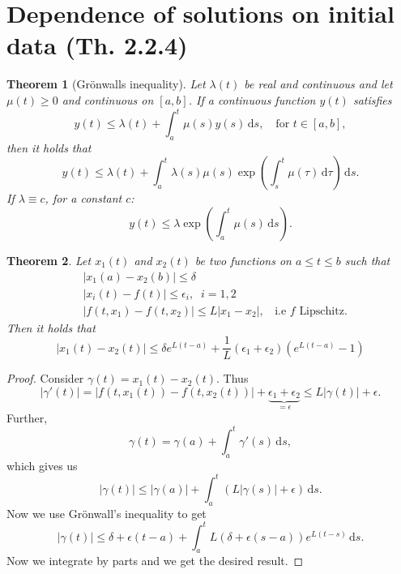 \documentclass[12pt, a4paper]{article}
\newcommand{\rd}{\ensuremath{\mathrm{d}}}
\newcommand{\id}{\ensuremath{\,\rd}}
\newtheorem{theorem}{Theorem}[section]
\begin{document}
\section{Dependence of solutions on initial data (Th. 2.2.4)}

\begin{theorem}[Grönwalls inequality]
Let $\lambda(t)$ be real and continuous and let $\mu(t)\geq 0$ and continuous on $[a,b]$. If a continuous function $y(t)$ satisfies
\begin{equation*}
y(t) \leq \lambda(t) + \int_a^t \mu(s)y(s)\id s, \quad \text{for } t\in[a,b],
\end{equation*}
then it holds that
\begin{equation*}
y(t)\leq \lambda(t) + \int_a^t \lambda(s)\mu(s)\exp\left(\int_s^t \mu(\tau)\id \tau\right)\id s.
\end{equation*}
If $\lambda \equiv c$, for a constant $c$:
\begin{equation*}
y(t) \leq \lambda \exp\left(\int_a^t \mu(s)\id s\right).
\end{equation*}
\end{theorem}

\begin{theorem}
Let $x_1(t)$ and $x_2(t)$ be two functions on $a\leq t\leq b$ such that
\begin{equation*}
\begin{split}
&|x_1(a)-x_2(b)|\leq\delta\\
&|x_i(t)-f(t)|\leq\epsilon_i,\;\; i=1,2 \\
&|f(t,x_1) - f(t,x_2)| \leq L|x_1-x_2|,\;\; \text{ i.e } f \text{ Lipschitz}.
\end{split}
\end{equation*}
Then it holds that
\begin{equation*}
|x_1(t)-x_2(t)|\leq \delta e^{L(t-a)}+ \frac{1}{L}(\epsilon_1 + \epsilon_2)(e^{L(t-a)}-1)
\end{equation*}
\end{theorem}
\begin{proof}
Consider $\gamma(t) = x_1(t) - x_2(t)$. Thus
\begin{equation*}
|\gamma '(t)| = |f(t,x_1(t))-f(t,x_2(t))| + \underbrace{\epsilon_1 + \epsilon_2}_{=\epsilon} \leq L|\gamma(t)|+\epsilon.
\end{equation*}
Further, 
\begin{equation*}
\gamma(t) = \gamma(a) + \int_a^t \gamma'(s)\id s,
\end{equation*}
which gives us
\begin{equation*}
|\gamma(t)|\leq |\gamma(a)| + \int_a^t \left( L|\gamma(s)| + \epsilon \right) \id s.
\end{equation*}
Now we use Grönwall's inequality to get
\begin{equation*}
|\gamma(t)| \leq \delta + \epsilon(t-a) + \int_a^t L(\delta + \epsilon(s-a))e^{L(t-s)}\id s.
\end{equation*}
Now we integrate by parts and we get the desired result.
\end{proof}
\end{document}
